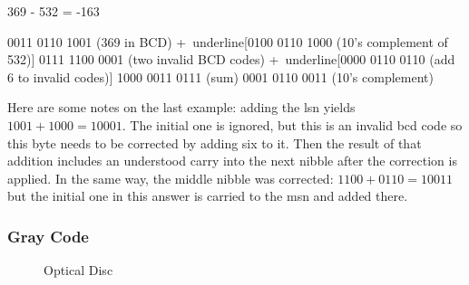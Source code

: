 \begin{minipage}{\linewidth} %

\begin{binDisp}[commandchars=~\[\]]

    369 - 532 = -163

          0011 0110 1001  (369 in BCD)
         +~underline[0100 0110 1000  (10's complement of 532)]
          0111 1100 0001  (two invalid BCD codes)
         +~underline[0000 0110 0110  (add 6 to invalid codes)]
          1000 0011 0111  (sum)
          0001 0110 0011  (10's complement)

\end{binDisp}
\end{minipage}

Here are some notes on the last example: adding the \gls{lsn} yields $ 1001+1000=10001 $. The initial one is ignored, but this is an invalid \gls{bcd} code so this byte needs to be corrected by adding six to it. Then the result of that addition includes an understood carry into the next nibble after the correction is applied. In the same way, the middle nibble was corrected: $ 1100+0110=10011 $ but the initial one in this answer is carried to the \gls{msn} and added there.

\subsubsection{Gray Code}
\label{MO:subsub:gray_code}

\begin{wrapfigure}{r}{0.3\textwidth}
  \caption{Optical Disc}
  \label{MO:fig:gray_code_disc}
  \centering

  \xdef\IntRad{2}
  \xdef\Rad{.5}

  \newcommand{\Sector}[2][]{%
    \draw[#1] (22.5:#2) arc (22.5:0:#2)
    --(#2+\Rad,0) arc (0:22.5:#2+\Rad)
    -- cycle ;
  }

\end{wrapfigure}


